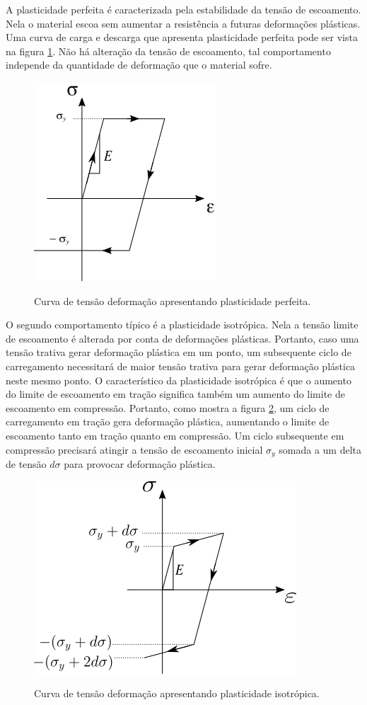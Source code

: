 A plasticidade perfeita é caracterizada pela estabilidade da tensão de escoamento. Nela o material escoa sem aumentar a resistência a futuras deformações plásticas. Uma curva de carga e descarga que apresenta plasticidade perfeita pode ser vista na figura \ref{fig:plastperf}. Não há alteração da tensão de escoamento, tal comportamento independe da quantidade de deformação que o material sofre. \\ 
\begin{figure}[H]
    \centering
    \caption{Curva de tensão deformação apresentando plasticidade perfeita. }
    \includegraphics[width=0.5\linewidth]{images/plasticidade_perfeita.png}
    \label{fig:plastperf}
\end{figure}

O segundo comportamento típico é a plasticidade isotrópica. Nela a tensão limite de escoamento é alterada por conta de deformações plásticas. Portanto, caso uma tensão trativa gerar deformação plástica em um ponto, um subsequente ciclo de carregamento necessitará de maior tensão trativa para gerar deformação plástica neste mesmo ponto. O característico da plasticidade isotrópica é que o aumento do limite de escoamento em tração significa também um aumento do limite de escoamento em compressão.
Portanto, como mostra a figura \ref{fig:plastiso}, um ciclo de carregamento em tração gera deformação plástica, aumentando o limite de escoamento tanto em tração quanto em compressão. Um ciclo subsequente em compressão precisará atingir a tensão de escoamento inicial $\sigma_y$ somada a um delta de tensão $d\sigma$ para provocar deformação plástica. 

\begin{figure}[H]
    \centering
    \caption{Curva de tensão deformação apresentando plasticidade isotrópica. }
    \includegraphics[width=0.5\linewidth]{images/plasticidade_iso.png}
    \label{fig:plastiso}
\end{figure}

